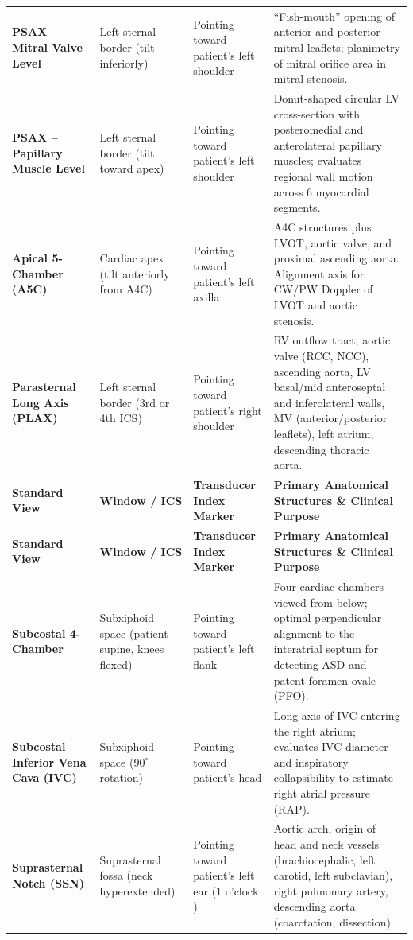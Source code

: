 \documentclass[11pt,a4paper]{article}
\begin{document}
\begin{longtable}{p{3.0cm}p{2.6cm}p{4.2cm}p{4.6cm}}
\addlinespace
\textbf{PSAX -- Mitral Valve Level} & Left sternal border (tilt inferiorly) & Pointing toward patient's left shoulder & ``Fish-mouth'' opening of anterior and posterior mitral leaflets; planimetry of mitral orifice area in mitral stenosis. \\
\addlinespace
\textbf{PSAX -- Papillary Muscle Level} & Left sternal border (tilt toward apex) & Pointing toward patient's left shoulder & Donut-shaped circular LV cross-section with posteromedial and anterolateral papillary muscles; evaluates regional wall motion across 6 myocardial segments. \\
\addlinespace
\textbf{Apical 5-Chamber (A5C)} & Cardiac apex (tilt anteriorly from A4C) & Pointing toward patient's left axilla & A4C structures plus LVOT, aortic valve, and proximal ascending aorta. Alignment axis for CW/PW Doppler of LVOT and aortic stenosis. \\
\addlinespace
\textbf{Parasternal Long Axis (PLAX)} & Left sternal border (3rd or 4th ICS) & Pointing toward patient's right shoulder & RV outflow tract, aortic valve (RCC, NCC), ascending aorta, LV basal/mid anteroseptal and inferolateral walls, MV (anterior/posterior leaflets), left atrium, descending thoracic aorta. \\
\addlinespace
\textbf{Standard View} & \textbf{Window / ICS} & \textbf{Transducer Index Marker} & \textbf{Primary Anatomical Structures \& Clinical Purpose} \\
\addlinespace
\textbf{Standard View} & \textbf{Window / ICS} & \textbf{Transducer Index Marker} & \textbf{Primary Anatomical Structures \& Clinical Purpose} \\
\addlinespace
\textbf{Subcostal 4-Chamber} & Subxiphoid space (patient supine, knees flexed) & Pointing toward patient's left flank & Four cardiac chambers viewed from below; optimal perpendicular alignment to the interatrial septum for detecting ASD and patent foramen ovale (PFO). \\
\addlinespace
\textbf{Subcostal Inferior Vena Cava (IVC)} & Subxiphoid space ($90^\circ$ rotation) & Pointing toward patient's head & Long-axis of IVC entering the right atrium; evaluates IVC diameter and inspiratory collapsibility to estimate right atrial pressure (RAP). \\
\addlinespace
\textbf{Suprasternal Notch (SSN)} & Suprasternal fossa (neck hyperextended) & Pointing toward patient's left ear ($1\text{ o'clock}$) & Aortic arch, origin of head and neck vessels (brachiocephalic, left carotid, left subclavian), right pulmonary artery, descending aorta (coarctation, dissection). \\
\end{longtable}
\end{document}
